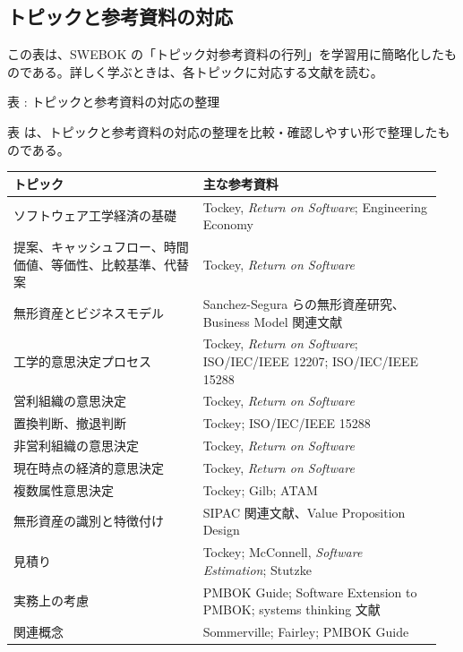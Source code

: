 \subsection{トピックと参考資料の対応}

この表は、SWEBOK の「トピック対参考資料の行列」を学習用に簡略化したものである。詳しく学ぶときは、各トピックに対応する文献を読む。

\par\smallskip\noindent{}\label{tab:ch15-04}表 \thetable: トピックと参考資料の対応の整理\par\smallskip
表 \thetable は、トピックと参考資料の対応の整理を比較・確認しやすい形で整理したものである。\par\smallskip
\begin{longtable}{L{0.42\linewidth} L{0.53\linewidth}}
\toprule
トピック & 主な参考資料 \\
\midrule
ソフトウェア工学経済の基礎 & Tockey, \textit{Return on Software}; Engineering Economy \\
提案、キャッシュフロー、時間価値、等価性、比較基準、代替案 & Tockey, \textit{Return on Software} \\
無形資産とビジネスモデル & Sanchez-Segura らの無形資産研究、Business Model 関連文献 \\
工学的意思決定プロセス & Tockey, \textit{Return on Software}; ISO/IEC/IEEE 12207; ISO/IEC/IEEE 15288 \\
営利組織の意思決定 & Tockey, \textit{Return on Software} \\
置換判断、撤退判断 & Tockey; ISO/IEC/IEEE 15288 \\
非営利組織の意思決定 & Tockey, \textit{Return on Software} \\
現在時点の経済的意思決定 & Tockey, \textit{Return on Software} \\
複数属性意思決定 & Tockey; Gilb; ATAM \\
無形資産の識別と特徴付け & SIPAC 関連文献、Value Proposition Design \\
見積り & Tockey; McConnell, \textit{Software Estimation}; Stutzke \\
実務上の考慮 & PMBOK Guide; Software Extension to PMBOK; systems thinking 文献 \\
関連概念 & Sommerville; Fairley; PMBOK Guide \\
\bottomrule
\end{longtable}
